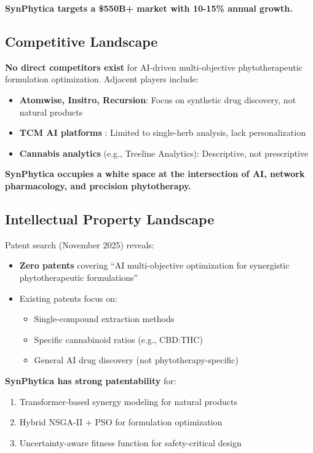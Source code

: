 \documentclass[12pt, a4paper]{article}
\begin{document}
\textbf{SynPhytica targets a \$550B+ market with 10-15\% annual growth.}

\subsection{Competitive Landscape}

\textbf{No direct competitors exist} for AI-driven multi-objective phytotherapeutic formulation optimization. Adjacent players include:

\begin{itemize}
    \item \textbf{Atomwise, Insitro, Recursion}: Focus on synthetic drug discovery, not natural products
    \item \textbf{TCM AI platforms} \citep{Zhou2024}: Limited to single-herb analysis, lack personalization
    \item \textbf{Cannabis analytics} (e.g., Treeline Analytics): Descriptive, not prescriptive
\end{itemize}

\textbf{SynPhytica occupies a white space at the intersection of AI, network pharmacology, and precision phytotherapy.}

\subsection{Intellectual Property Landscape}

Patent search (November 2025) reveals:
\begin{itemize}
    \item \textbf{Zero patents} covering ``AI multi-objective optimization for synergistic phytotherapeutic formulations''
    \item Existing patents focus on:
    \begin{itemize}
        \item Single-compound extraction methods
        \item Specific cannabinoid ratios (e.g., CBD:THC)
        \item General AI drug discovery (not phytotherapy-specific)
    \end{itemize}
\end{itemize}

\textbf{SynPhytica has strong patentability} for:
\begin{enumerate}
    \item Transformer-based synergy modeling for natural products
    \item Hybrid NSGA-II + PSO for formulation optimization
    \item Uncertainty-aware fitness function for safety-critical design
\end{enumerate}
\end{document}
